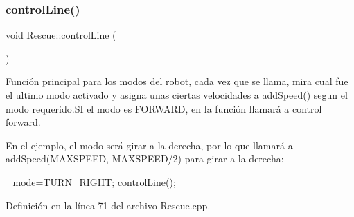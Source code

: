 \subsubsection{\texorpdfstring{control\+Line()}{controlLine()}}
{\footnotesize\ttfamily void Rescue\+::control\+Line (\begin{DoxyParamCaption}{ }\end{DoxyParamCaption})}



Función principal para los modos del robot, cada vez que se llama, mira cual fue el ultimo modo activado y asigna unas ciertas velocidades a \hyperlink{classRescue_a9a430924f65d71eca4e02dc9b2704947_a9a430924f65d71eca4e02dc9b2704947}{add\+Speed()} segun el modo requerido.\+SI el modo es F\+O\+R\+W\+A\+RD, en la función llamará a control forward. 

En el ejemplo, el modo será girar a la derecha, por lo que llamará a add\+Speed(M\+A\+X\+S\+P\+E\+ED,-\/\+M\+A\+X\+S\+P\+E\+E\+D/2) para girar a la derecha\+: 
\begin{DoxyCode}
\hyperlink{classRescue_a70a5e292c84029568ff6c0de2f2d9f43_a70a5e292c84029568ff6c0de2f2d9f43}{\_mode}=\hyperlink{classRescue_ab44ced9ce57b1b0d19b5456cd952d702_ab44ced9ce57b1b0d19b5456cd952d702aabd16068766c629e1f83fd217668a2e8}{TURN\_RIGHT};
\hyperlink{classRescue_aeef91de334e7779ce2fb2c2b57cd70c3_aeef91de334e7779ce2fb2c2b57cd70c3}{controlLine}();
\end{DoxyCode}
 

Definición en la línea 71 del archivo Rescue.\+cpp.


